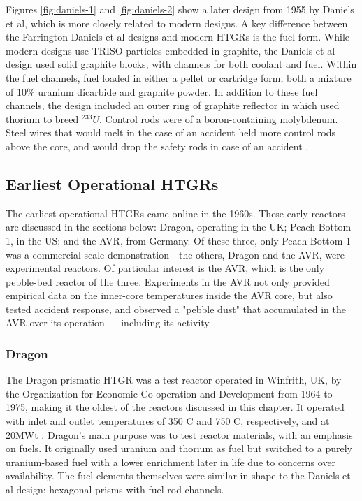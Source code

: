 


Figures \ref{fig:daniels-1} and \ref{fig:daniels-2} show a later design from 1955 by Daniels et al, which is more closely related to modern designs.  A key difference between the Farrington Daniels et al designs and modern HTGRs is the fuel form.  While modern designs use TRISO particles embedded in graphite, the Daniels et al design used solid graphite blocks, with channels for both coolant and fuel.  Within the fuel channels, fuel loaded in either a pellet or cartridge form, both a mixture of 10$\%$ uranium dicarbide and graphite powder.  In addition to these fuel channels, the design included an outer ring of graphite reflector in which used thorium to breed $^{233}U$.  Control rods were of a boron-containing molybdenum.  Steel wires that would melt in the case of an accident held more control rods above the core, and would drop the safety rods in case of an accident \cite{simnad_early_1991}.

\subsection{Earliest Operational HTGRs}

The earliest operational HTGRs came online in the 1960s.  These early reactors are discussed in the sections below: Dragon, operating in the UK; Peach Bottom 1, in the US; and the AVR, from Germany.  Of these three, only Peach Bottom 1 was a commercial-scale demonstration - the others, Dragon and the AVR, were experimental reactors.  Of particular interest is the AVR, which is the only pebble-bed reactor of the three.  Experiments in the AVR not only provided empirical data on the inner-core temperatures inside the AVR core, but also tested accident response, and observed a "pebble dust" that accumulated in the AVR over its operation --- including its activity.

\subsubsection{Dragon}
\label{dragon}

The Dragon prismatic HTGR was a test reactor operated in Winfrith, UK, by the Organization for Economic Co-operation and Development from 1964 to 1975, making it the oldest of the reactors discussed in this chapter.  It operated with inlet and outlet temperatures of 350 \textdegree C and 750 \textdegree C, respectively, and at 20MWt \cite{beck_high_nodate}.  Dragon's main purpose was to test reactor materials, with an emphasis on fuels.  It originally used uranium and thorium as fuel but switched to a purely uranium-based fuel with a lower enrichment later in life due to concerns over availability.  The fuel elements themselves were similar in shape to the Daniels et al design: hexagonal prisms with fuel rod channels.

